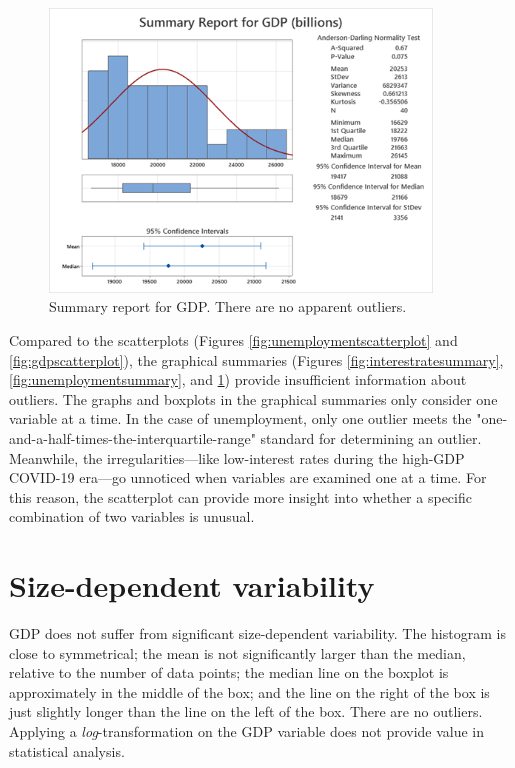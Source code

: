 \documentclass[12pt]{article}
\begin{document}
\begin{figure}
\begin{center}
\includegraphics[width=4in]{images/gdp-summary.png}
\end{center}
\caption{Summary report for GDP. There are no apparent outliers.\label{fig:gdpsummary}}
\end{figure}
Compared to the scatterplots (Figures \ref{fig:unemploymentscatterplot} and \ref{fig:gdpscatterplot}), the graphical summaries (Figures \ref{fig:interestratesummary}, \ref{fig:unemploymentsummary}, and \ref{fig:gdpsummary}) provide insufficient information about outliers. The graphs and boxplots in the graphical summaries only consider one variable at a time. In the case of unemployment, only one outlier meets the "one-and-a-half-times-the-interquartile-range" standard for determining an outlier. Meanwhile, the irregularities---like low-interest rates during the high-GDP COVID-19 era---go unnoticed when variables are examined one at a time. For this reason, the scatterplot can provide more insight into whether a specific combination of two variables is unusual.
\section{Size-dependent variability}
\label{sec:sizedepdendentvariability}
GDP does not suffer from significant size-dependent variability. The histogram is close to symmetrical; the mean is not significantly larger than the median, relative to the number of data points; the median line on the boxplot is approximately in the middle of the box; and the line on the right of the box is just slightly longer than the line on the left of the box. There are no outliers. Applying a \textit{log}-transformation on the GDP variable does not provide value in statistical analysis.
\end{document}
